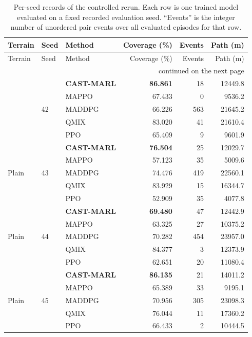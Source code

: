 \begin{longtable}{lllrrr}

\caption{Per-seed records of the controlled rerun. Each row is one trained model evaluated on a fixed recorded evaluation seed. ``Events'' is the integer number of unordered pair events over all evaluated episodes for that row.}\label{tab:supp-perseed}\\
\toprule
Terrain & Seed & Method & Coverage (\%) & Events & Path (m) \\
\midrule
\endfirsthead
\toprule
Terrain & Seed & Method & Coverage (\%) & Events & Path (m) \\
\midrule
\endhead
\midrule
\multicolumn{6}{r}{continued on the next page}\\
\endfoot
\bottomrule
\endlastfoot
\multirow{5}{*}{Plain} & \multirow{5}{*}{42} & \textbf{CAST-MARL} & \textbf{86.861} & 18 & 12449.8 \\
 &  & MAPPO & 67.433 & 0 & 9536.2 \\
 &  & MADDPG & 66.226 & 563 & 21645.2 \\
 &  & QMIX & 83.020 & 41 & 21610.4 \\
 &  & PPO & 65.409 & 9 & 9601.9 \\
\midrule
\multirow{5}{*}{Plain} & \multirow{5}{*}{43} & \textbf{CAST-MARL} & \textbf{76.504} & 25 & 12029.7 \\
 &  & MAPPO & 57.123 & 35 & 5009.6 \\
 &  & MADDPG & 74.476 & 419 & 22560.1 \\
 &  & QMIX & 83.929 & 15 & 16344.7 \\
 &  & PPO & 52.909 & 35 & 4077.8 \\
\midrule
\multirow{5}{*}{Plain} & \multirow{5}{*}{44} & \textbf{CAST-MARL} & \textbf{69.480} & 47 & 12442.9 \\
 &  & MAPPO & 63.325 & 27 & 10375.2 \\
 &  & MADDPG & 70.282 & 454 & 23957.0 \\
 &  & QMIX & 84.377 & 3 & 12373.9 \\
 &  & PPO & 62.651 & 20 & 11080.4 \\
\midrule
\multirow{5}{*}{Plain} & \multirow{5}{*}{45} & \textbf{CAST-MARL} & \textbf{86.135} & 21 & 14011.2 \\
 &  & MAPPO & 65.389 & 33 & 9195.1 \\
 &  & MADDPG & 70.956 & 305 & 23098.3 \\
 &  & QMIX & 76.044 & 11 & 17360.2 \\
 &  & PPO & 66.433 & 2 & 10444.5 \\

\end{longtable}
